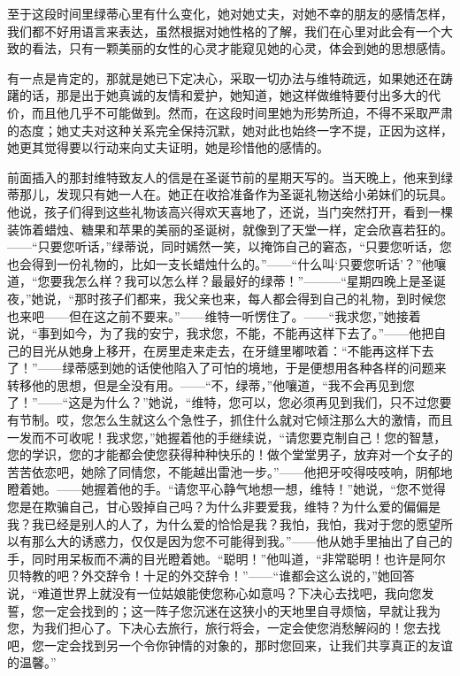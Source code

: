 \documentclass[12pt,oneside]{book}
\begin{document}
\begin{framed}
至于这段时间里绿蒂心里有什么变化，她对她丈夫，对她不幸的朋友的感情怎样，我们都不好用语言来表达，虽然根据对她性格的了解，我们在心里对此会有一个大致的看法，只有一颗美丽的女性的心灵才能窥见她的心灵，体会到她的思想感情。

有一点是肯定的，那就是她已下定决心，采取一切办法与维特疏远，如果她还在踌躇的话，那是出于她真诚的友情和爱护，她知道，她这样做维特要付出多大的代价，而且他几乎不可能做到。然而，在这段时间里她为形势所迫，不得不采取严肃的态度；她丈夫对这种关系完全保持沉默，她对此也始终一字不提，正因为这样，她更其觉得要以行动来向丈夫证明，她是珍惜他的感情的。

前面插入的那封维特致友人的信是在圣诞节前的星期天写的。当天晚上，他来到绿蒂那儿，发现只有她一人在。她正在收拾准备作为圣诞礼物送给小弟妹们的玩具。他说，孩子们得到这些礼物该高兴得欢天喜地了，还说，当门突然打开，看到一棵装饰着蜡烛、糖果和苹果的美丽的圣诞树，就像到了天堂一样，定会欣喜若狂的。——“只要您听话，”绿蒂说，同时嫣然一笑，以掩饰自己的窘态，“只要您听话，您也会得到一份礼物的，比如一支长蜡烛什么的。”——“什么叫‘只要您听话’？”他嚷道，“您要我怎么样？我可以怎么样？最最好的绿蒂！”———“星期四晚上是圣诞夜，”她说，“那时孩子们都来，我父亲也来，每人都会得到自己的礼物，到时候您也来吧——但在这之前不要来。”——维特一听愣住了。——“我求您，”她接着说，“事到如今，为了我的安宁，我求您，不能，不能再这样下去了。”——他把自己的目光从她身上移开，在房里走来走去，在牙缝里嘟哝着：“不能再这样下去了！”——绿蒂感到她的话使他陷入了可怕的境地，于是便想用各种各样的问题来转移他的思想，但是全没有用。——“不，绿蒂，”他嚷道，“我不会再见到您了！”——“这是为什么？”她说，“维特，您可以，您必须再见到我们，只不过您要有节制。哎，您怎么生就这么个急性子，抓住什么就对它倾注那么大的激情，而且一发而不可收呢！我求您，”她握着他的手继续说，“请您要克制自己！您的智慧，您的学识，您的才能都会使您获得种种快乐的！做个堂堂男子，放弃对一个女子的苦苦依恋吧，她除了同情您，不能越出雷池一步。”——他把牙咬得吱吱响，阴郁地瞪着她。——她握着他的手。“请您平心静气地想一想，维特！”她说，“您不觉得您是在欺骗自己，甘心毁掉自己吗？为什么非要爱我，维特？为什么爱的偏偏是我？我已经是别人的人了，为什么爱的恰恰是我？我怕，我怕，我对于您的愿望所以有那么大的诱惑力，仅仅是因为您不可能得到我。”——他从她手里抽出了自己的手，同时用呆板而不满的目光瞪着她。“聪明！”他叫道，“非常聪明！也许是阿尔贝特教的吧？外交辞令！十足的外交辞令！”——“谁都会这么说的，”她回答说，“难道世界上就没有一位姑娘能使您称心如意吗？下决心去找吧，我向您发誓，您一定会找到的；这一阵子您沉迷在这狭小的天地里自寻烦恼，早就让我为您，为我们担心了。下决心去旅行，旅行将会，一定会使您消愁解闷的！您去找吧，您一定会找到另一个令你钟情的对象的，那时您回来，让我们共享真正的友谊的温馨。”


\end{framed}
\end{document}
